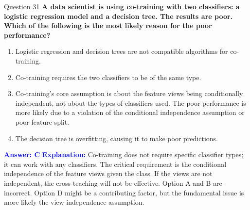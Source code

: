 \documentclass[8pt]{beamer}  %
\begin{document}
	\begin{frame}{Question 31}
		\textbf{A data scientist is using co-training with two classifiers: a logistic regression model and a decision tree. The results are poor. Which of the following is the most likely reason for the poor performance?}
		\begin{enumerate}
			\item Logistic regression and decision trees are not compatible algorithms for co-training.
			\item Co-training requires the two classifiers to be of the same type.
			\item Co-training's core assumption is about the feature views being conditionally independent, not about the types of classifiers used. The poor performance is more likely due to a violation of the conditional independence assumption or poor feature split.
			\item The decision tree is overfitting, causing it to make poor predictions.
		\end{enumerate}
		\vspace{0.2cm}
		\textcolor{blue}{\textbf{Answer: C}}
		\vspace{0.2cm}
		\textcolor{blue}{\textbf{Explanation:}} Co-training does not require specific classifier types; it can work with any classifiers. The critical requirement is the conditional independence of the feature views given the class. If the views are not independent, the cross-teaching will not be effective. Option A and B are incorrect. Option D might be a contributing factor, but the fundamental issue is more likely the view independence assumption.
	\end{frame}
	
\end{document}
